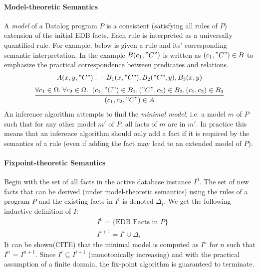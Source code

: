 \paragraph{Model-theoretic Semantics}\NL
A \textit{model} of a Datalog program $P$ is a consistent (satisfying all rules of $P$) extension of the initial EDB facts. Each rule is interpreted as a universally quantified rule. For example, below is given a rule and its' corresponding semantic interpretation. In the example $B(c_1, "C")$ is written as $(c_1, "C") \in B$ to emphasize the practical correspondence between predicates and relations.
\begin{align*}
A(x, y, "C") :- \;B_1(x, "C"), B_2("C", y), B_3(x, y)
\end{align*}
\begin{align*}
\infer{(c_1, c_2, "C") \in A}{%
	\forall c_1 \in \Omega.\;\forall c_2 \in \Omega. \;\; (c_1, "C") \in B_1, ("C", c_2) \in B_2, (c_1,c_2) \in B_3
}
\end{align*}
An inference algorithm attempts to find the \textit{minimal model}, i.e. a model $m$ of $P$ such that for any other model $m'$ of $P$, all facts of $m$ are in $m'$. In practice this means that an inference algorithm should only add a fact if it is required by the semantics of a rule (even if adding the fact may lead to an extended model of $P$). 

\paragraph{Fixpoint-theoretic Semantics}\NL
Begin with the set of all facts in the active database instance $I^0$. The set of new facts that can be derived (under model-theoretic semantics) using the rules of a program $P$ and the existing facts in $I^i$ is denoted $\Delta_i$. We get the following inductive definition of $I$:
\begin{align*}
&I^0 = \{ \text{EDB Facts in } P \}\\
&I^{i + 1} = I^i \cup \Delta_i 
\end{align*}
It can be shown(CITE) that the minimal model is computed as $I^{n}$ for $n$ such that $I^{n}$ = $I^{n + 1}$. Since $I^i \subseteq I^{i + 1}$ (monotonically increasing) and with the practical assumption of a finite domain, the fix-point algorithm is guaranteed to terminate.

